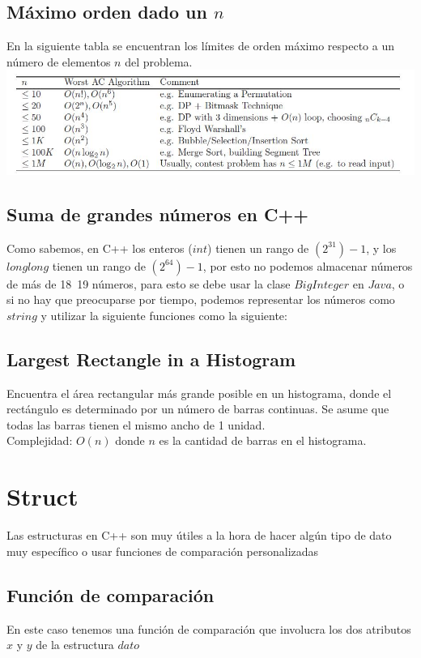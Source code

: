 \documentclass[10pt,letterpaper,twocolumn]{article}
\newcommand{\source}[1]{
	
	\dotfill
}
\begin{document}
	\subsection{Máximo orden dado un $n$}
		En la siguiente tabla se encuentran los límites de orden máximo respecto a un número de elementos $n$ del problema.\\
		\includegraphics[scale=0.5]{./src/maxorder.jpg}
	\subsection{Suma de grandes números en C++}
		Como sabemos, en C++ los enteros ($int$) tienen un rango de $(2^31)-1$, y los $long long$ tienen un rango de $(2^64)-1$, por esto no podemos almacenar números de más de 18~19 números, para esto se debe usar la clase $BigInteger$ en $Java$, o si no hay que preocuparse por tiempo, podemos representar los números como $string$ y utilizar la siguiente funciones como la siguiente:
		\source{./src/bigIntegerCpp.cpp}
	\subsection{Largest Rectangle in a Histogram}
		Encuentra el área rectangular más grande posible en un histograma, donde el rectángulo es determinado por un número de barras continuas. Se asume que todas las barras tienen el mismo ancho de 1 unidad. \\
		Complejidad: $O(n)$ donde $n$ es la cantidad de barras en el histograma.
		\source{./src/largest_rectangle.cpp}



\section{Struct}
	Las estructuras en C++ son muy útiles a la hora de hacer algún tipo de dato muy específico o usar funciones de comparación personalizadas
	\subsection{Función de comparación}
	En este caso tenemos una función de comparación que involucra los dos atributos $x$ y $y$ de la estructura $dato$
	\source{./src/struct.cpp}
\end{document}
